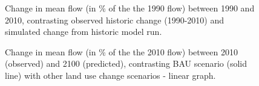 \begin{figure}[h!]
 \caption{Change in mean flow (in \% of the the 1990 flow) between 1990 and 2010, contrasting observed historic change (1990-2010) and simulated change from historic model run.}
 \label{fig:flow_historic}
\end{figure}


\begin{figure}[h!]
 \caption{Change in mean flow (in \% of the the 2010 flow) between 2010 (observed) and 2100 (predicted), contrasting BAU scenario (solid line) with other land use change scenarios - linear graph.}
 \label{fig:flow_linear_1}
\end{figure}


